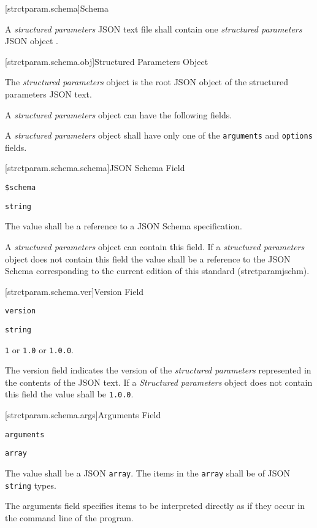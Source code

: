 [strctparam.schema]{Schema}

\pnum
A \emph{structured parameters} JSON text file shall contain one \emph{structured
parameters} JSON object .

[strctparam.schema.obj]{Structured Parameters Object}

\pnum
The \emph{structured parameters} object is the root JSON object of the 
structured parameters JSON text.

\pnum
A \emph{structured parameters} object can have the following fields.

\pnum
A \emph{structured parameters} object shall have only one of the 
\verb|arguments| and \verb|options| fields.

[strctparam.schema.schema]{JSON Schema Field}

\begin{itemdescr}

	\pnum \fldname \verb|$schema|

	\pnum \fldtype \verb|string|

	\pnum \fldval
	The value shall be a reference to a JSON Schema specification.

	\pnum \flddesc
	A \emph{structured parameters} object can contain this field. If a
	\emph{structured parameters} object does not contain this field the value 
	shall be a reference to the JSON Schema corresponding to the current 
	edition of this standard (strctparamjschm).

\end{itemdescr}

[strctparam.schema.ver]{Version Field}

\begin{itemdescr}

	\pnum \fldname \verb|version|

	\pnum \fldtype \verb|string|

	\pnum \fldval
	\verb|1| or \verb|1.0| or \verb|1.0.0|.

	\pnum
	\flddesc
	The version field indicates the version of the \emph{structured parameters}
	represented in the contents of the JSON text. If a \emph{Structured
	parameters} object does not contain this field the value shall be
	\verb|1.0.0|.

\end{itemdescr}

[strctparam.schema.args]{Arguments Field}

\begin{itemdescr}

	\pnum \fldname \verb|arguments|

	\pnum \fldtype \verb|array|

	\pnum \fldval
	The value shall be a JSON \verb|array|. The items in the \verb|array| shall
	be of JSON \verb|string| types.

	\pnum \flddesc
	The arguments field specifies items to be interpreted directly as if they
	occur in the command line of the program.

\end{itemdescr}

